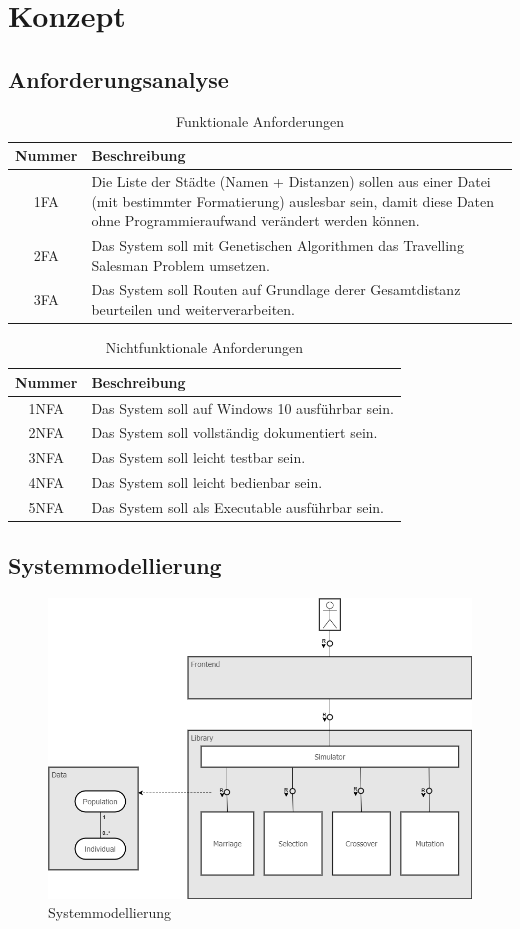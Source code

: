 \section{Konzept}

\subsection{Anforderungsanalyse}

\begin{table}[H]
\caption{Funktionale Anforderungen}
\begin{tabular}{|c|p{12cm}|}
Nummer & Beschreibung \\
\hline
1FA & Die Liste der Städte (Namen + Distanzen) sollen aus einer Datei (mit bestimmter Formatierung) auslesbar sein, damit diese Daten ohne Programmieraufwand verändert werden können. \\  
2FA & Das System soll mit Genetischen Algorithmen das Travelling Salesman Problem umsetzen. \\  
3FA & Das System soll Routen auf Grundlage derer Gesamtdistanz beurteilen und weiterverarbeiten. \\  
\end{tabular}
\label{tab:fa}
\end{table}

\begin{table}[H]
\caption{Nichtfunktionale Anforderungen}
\begin{tabular}{|c|p{10cm}|}
 Nummer & Beschreibung \\ 
\hline
1NFA & Das System soll auf Windows 10 ausführbar sein.\\
2NFA & Das System soll vollständig dokumentiert sein.\\
3NFA & Das System soll leicht testbar sein.\\
4NFA & Das System soll leicht bedienbar sein.\\
5NFA & Das System soll als Executable ausführbar sein.\\
\end{tabular}
\label{tab:nfa}
\end{table}

\subsection{Systemmodellierung}

\begin{figure}[H]
\centering
\includegraphics[width=1\textwidth]{img/Vortrag/Systemmodellierung.png}
\caption{Systemmodellierung}
\label{fig:systemmodellierung}
\end{figure}


